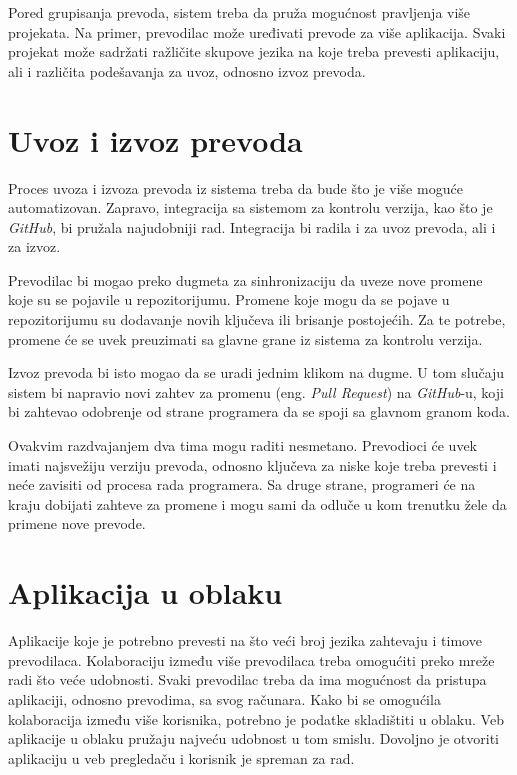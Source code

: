 Pored grupisanja prevoda, sistem treba da pruža mogućnost pravljenja više projekata. Na primer, prevodilac 
može uređivati prevode za više aplikacija. Svaki projekat može sadržati ražličite skupove jezika na koje 
treba prevesti aplikaciju, ali i različita podešavanja za uvoz, odnosno izvoz prevoda.


\section{Uvoz i izvoz prevoda}\label{sec:funkcionalni_zahtevi-uvoz_izvoz}

Proces uvoza i izvoza prevoda iz sistema treba da bude što je više moguće automatizovan. Zapravo, integracija
sa sistemom za kontrolu verzija, kao što je \textit{GitHub}, bi pružala najudobniji rad. Integracija bi radila i za 
uvoz prevoda, ali i za izvoz. 

Prevodilac bi mogao preko dugmeta za sinhronizaciju da uveze nove promene 
koje su se pojavile u repozitorijumu. Promene koje mogu da se pojave u repozitorijumu su dodavanje novih 
ključeva ili brisanje postojećih. Za te potrebe, promene će se uvek preuzimati sa glavne grane iz sistema za 
kontrolu verzija. 

Izvoz prevoda bi isto mogao da se uradi jednim klikom na dugme. U tom slučaju sistem bi napravio novi zahtev 
za promenu (eng. \textit{Pull Request}) na \textit{GitHub}-u, koji bi zahtevao odobrenje od strane 
programera da se spoji sa glavnom granom koda.

Ovakvim razdvajanjem dva tima mogu raditi nesmetano. Prevodioci će uvek imati najsvežiju verziju prevoda, 
odnosno ključeva za niske koje treba prevesti i neće zavisiti od procesa rada programera. Sa druge strane,
programeri će na kraju dobijati zahteve za promene i mogu sami da odluče u kom trenutku žele da primene nove
prevode.


\section{Aplikacija u oblaku}\label{sec:funkcionalni_zahtevi-aplikacija_u_oblaku}

Aplikacije koje je potrebno prevesti na što veći broj jezika zahtevaju i timove prevodilaca. Kolaboraciju 
između više prevodilaca treba omogućiti preko mreže radi što veće udobnosti. Svaki prevodilac treba da ima 
mogućnost da pristupa aplikaciji, odnosno prevodima, sa svog računara. Kako bi se omogućila kolaboracija 
između više korisnika, potrebno je podatke skladištiti u oblaku. Veb aplikacije u oblaku pružaju najveću 
udobnost u tom smislu. Dovoljno je otvoriti aplikaciju u veb pregledaču i korisnik je spreman za rad.

